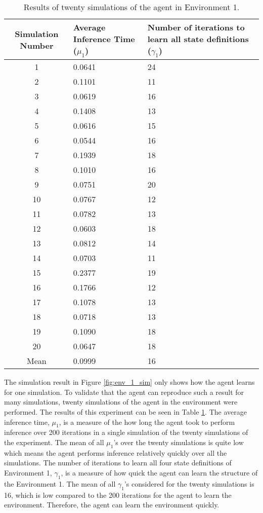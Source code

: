 \begin{table}[H]
\centering
\begin{tabular}{ |c|p{5cm}|p{5cm}| }
\hline
	Simulation Number & Average Inference Time ($\mu_1$) & Number of iterations to learn all state definitions ($\gamma_1$) \\ \hline
  1 & 0.0641 & 24 \\
  2 & 0.1101 & 11 \\
  3 & 0.0619 & 16  \\
  4 & 0.1408 & 13 \\
  5 & 0.0616 & 15\\
  6 & 0.0544 & 16 \\
  7 & 0.1939 & 18 \\
  8 & 0.1010 & 16 \\
  9 & 0.0751 & 20 \\
  10 & 0.0767 & 12 \\
  11 & 0.0782 & 13 \\
  12 & 0.0603 & 18 \\
  13 & 0.0812 & 14 \\
  14 & 0.0703 & 11 \\
  15 & 0.2377 & 19 \\
  16 & 0.1766 & 12 \\
  17 &  0.1078 & 13 \\
  18 & 0.0718 & 13 \\
  19 & 0.1090 & 18 \\
  20 & 0.0647 & 18 \\
  \hline
  Mean & 0.0999 & 16\\
	\hline  
  
\end{tabular}
\caption{Results of twenty simulations of the agent in Environment 1.}
\label{table:20_sim_env_1}
\end{table}

The simulation result in Figure \ref{fig:env_1_sim} only shows how the agent learns for one simulation. To validate that the agent can reproduce such a result for many simulations, twenty simulations of the agent in the environment were performed. The results of this experiment can be seen in Table \ref{table:20_sim_env_1}.
The average inference time, $\mu_1$, is a measure of the how long the agent took to perform inference over 200 iterations in a single simulation of the twenty simulations of the experiment. The mean of all $\mu_1$'s over the twenty simulations is quite low which means the agent performs inference relatively quickly over all the simulations. The number of iterations to learn all four state definitions of Environment 1, $\gamma_1$, is a measure of how quick the agent can learn the structure of the Environment 1. The mean of all $\gamma_1$'s considered for the twenty simulations is 16, which is low compared to the 200 iterations for the agent to learn the environment. Therefore, the agent can learn the environment quickly.


